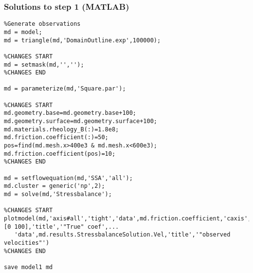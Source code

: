 \subsubsection{Solutions to step 1 (MATLAB)}
\begin{verbatim}%Generate observations
md = model;
md = triangle(md,'DomainOutline.exp',100000);

%CHANGES START
md = setmask(md,'','');
%CHANGES END

md = parameterize(md,'Square.par');

%CHANGES START
md.geometry.base=md.geometry.base+100;
md.geometry.surface=md.geometry.surface+100;
md.materials.rheology_B(:)=1.8e8;
md.friction.coefficient(:)=50;
pos=find(md.mesh.x>400e3 & md.mesh.x<600e3);
md.friction.coefficient(pos)=10;
%CHANGES END

md = setflowequation(md,'SSA','all');
md.cluster = generic('np',2);
md = solve(md,'Stressbalance');

%CHANGES START
plotmodel(md,'axis#all','tight','data',md.friction.coefficient,'caxis',[0 100],'title','"True" coef',...
   'data',md.results.StressbalanceSolution.Vel,'title','"observed velocities"')
%CHANGES END

save model1 md
\end{verbatim}

